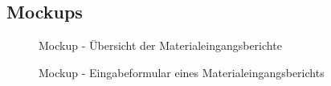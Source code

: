 \subsection{Mockups}
\label{subsec:Mockup}

\begin{figure}[htb]
\centering
{}
\caption{Mockup - Übersicht der Materialeingangsberichte}
\end{figure}

\begin{figure}[htb]
	\centering
	\caption{Mockup - Eingabeformular eines Materialeingangsberichts}
\end{figure}